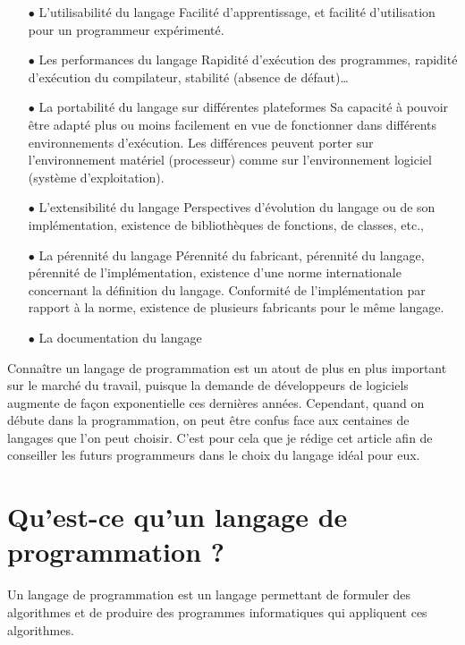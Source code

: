\documentclass[a4paper,12pt]{article} %
\begin{document}
\begin{itemize}
\item[$\bullet$]L’utilisabilité du langage
Facilité d'apprentissage, et facilité d'utilisation pour un programmeur expérimenté.
\item[$\bullet$]Les performances du langage
Rapidité d'exécution des programmes, rapidité d'exécution du compilateur,  stabilité (absence de défaut)…
\item[$\bullet$]La portabilité du langage sur différentes plateformes
Sa capacité à pouvoir être adapté plus ou moins facilement en vue de fonctionner dans différents environnements d'exécution. Les différences peuvent porter sur l'environnement matériel (processeur) comme sur l'environnement logiciel (système d'exploitation).
\item[$\bullet$]L’extensibilité du langage
Perspectives d'évolution du langage ou de son implémentation, existence de bibliothèques de fonctions, de classes, etc.,
\item[$\bullet$]La pérennité du langage
Pérennité du fabricant, pérennité du langage, pérennité de l'implémentation, existence d'une norme internationale concernant la définition du langage. Conformité de l'implémentation par rapport à la norme, existence de plusieurs fabricants pour le même langage.
\item[$\bullet$]La documentation du langage
\end{itemize}
Connaître un langage de programmation est un atout de plus en plus important sur le marché du travail, puisque la demande de développeurs de logiciels augmente de façon exponentielle ces dernières années.
Cependant, quand on débute dans la programmation, on peut être confus face aux centaines de langages que l’on peut choisir. C’est pour cela que je rédige cet article afin de conseiller les futurs programmeurs dans le choix du langage idéal pour eux.

\section{Qu’est-ce qu’un langage de programmation ?} %
Un langage de programmation est un langage permettant de formuler des algorithmes et de produire des programmes informatiques qui appliquent ces algorithmes.
\end{document}
